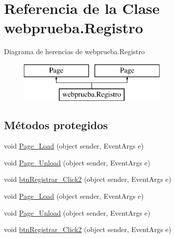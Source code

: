 \hypertarget{classwebprueba_1_1_registro}{}\section{Referencia de la Clase webprueba.\+Registro}
\label{classwebprueba_1_1_registro}
Diagrama de herencias de webprueba.\+Registro\begin{figure}[H]
\begin{center}
\leavevmode
\includegraphics[height=2.000000cm]{classwebprueba_1_1_registro}
\end{center}
\end{figure}
\subsection*{Métodos protegidos}
\begin{DoxyCompactItemize}
\item 
void \mbox{\hyperlink{classwebprueba_1_1_registro_a8cbcc641cfa3625b90acc4d223169a45}{Page\+\_\+\+Load}} (object sender, Event\+Args e)
\item 
void \mbox{\hyperlink{classwebprueba_1_1_registro_a55b248cd28e6482085487d8a1d7cee0e}{Page\+\_\+\+Unload}} (object sender, Event\+Args e)
\item 
void \mbox{\hyperlink{classwebprueba_1_1_registro_a142c34865f9d885c718e351a53c9372b}{btn\+Registrar\+\_\+\+Click2}} (object sender, Event\+Args e)
\item 
void \mbox{\hyperlink{classwebprueba_1_1_registro_a8cbcc641cfa3625b90acc4d223169a45}{Page\+\_\+\+Load}} (object sender, Event\+Args e)
\item 
void \mbox{\hyperlink{classwebprueba_1_1_registro_a55b248cd28e6482085487d8a1d7cee0e}{Page\+\_\+\+Unload}} (object sender, Event\+Args e)
\item 
void \mbox{\hyperlink{classwebprueba_1_1_registro_a142c34865f9d885c718e351a53c9372b}{btn\+Registrar\+\_\+\+Click2}} (object sender, Event\+Args e)
\end{DoxyCompactItemize}
